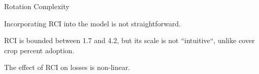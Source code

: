 \documentclass[notes, 11pt, aspectratio=169]{beamer}
\newenvironment{wideitemize}{\itemize\addtolength{\itemsep}{10pt}}{\enditemize}
\begin{document}


%    

%    


\begin{frame}{Rotation Complexity}
\begin{wideitemize}
    \item Incorporating RCI into the model is not straightforward.
    \item RCI is bounded between 1.7 and 4.2, but its scale is not ``intuitive``, unlike cover crop percent adoption.
    \item The effect of RCI on losses is non-linear.
\end{wideitemize}
\end{frame}
\end{document}
